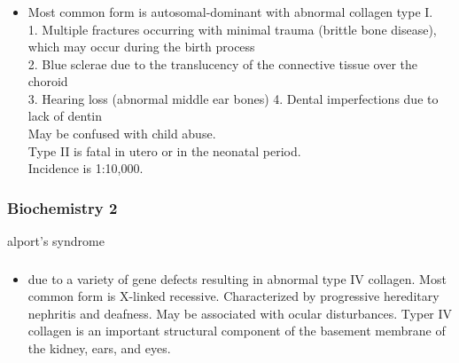 \documentclass[11pt]{beamer}
\begin{document}
\begin{frame}
 \frametitle{}
\begin{itemize}
\item Most common form is autosomal-dominant with abnormal collagen type I. \\ 1. Multiple fractures occurring with minimal trauma (brittle bone disease), which may occur during the birth process \\ 2. Blue sclerae due to the translucency of the connective tissue over the choroid \\ 3. Hearing loss (abnormal middle ear bones) 4. Dental imperfections due to lack of dentin \\ May be confused with child abuse. \\ Type II is fatal in utero or in the neonatal period. \\ Incidence is 1:10,000.
\end{itemize}
\end{frame}

\begin{frame}
 \frametitle{Biochemistry 2}
alport's syndrome 
\end{frame}

\begin{frame}
 \frametitle{}
\begin{itemize}
\item due to a variety of gene defects resulting in abnormal type IV collagen. Most common form is X-linked recessive. Characterized by progressive hereditary nephritis and deafness. May be associated with ocular disturbances. Typer IV collagen is an important structural component of the basement membrane of the kidney, ears, and eyes. 
\end{itemize}
\end{frame}
\end{document}
